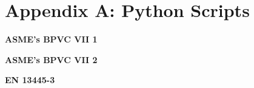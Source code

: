 \chapter{Appendix A: Python Scripts}
\label{chapt:appendixa}
\nopagebreak

\textbf{ASME's BPVC VII 1}

\pagebreak

\textbf{ASME's BPVC VII 2}

\pagebreak

\textbf{EN 13445-3}

